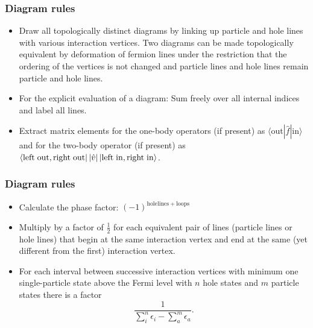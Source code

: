 \frame
{
\frametitle{Diagram rules}
\begin{small}
{\scriptsize
    \begin{itemize}
        \item Draw all topologically distinct diagrams by linking up particle and hole lines with various interaction vertices. Two diagrams can be made topologically equivalent by deformation of fermion lines under the restriction that the ordering of the vertices is not changed and particle lines and hole lines remain particle and hole lines.
        \item For the explicit evaluation of a diagram: Sum freely over all internal indices and label all lines. 
        \item Extract matrix elements for the one-body operators (if present) as $\langle \mathrm{out} |\hat{f}| \mathrm{in}\rangle$ and for the two-body operator (if present) as  
            $\bra{\mathrm{left\hspace{0.1cm}out, right\hspace{0.1cm}out}}|\hat{v}|\,|{\mathrm{left\hspace{0.1cm}in, right\hspace{0.1cm}in}}\rangle$. 
    \end{itemize}

}
\end{small}
}

\frame
{
\frametitle{Diagram rules}
\begin{small}
{\scriptsize
    \begin{itemize}
        \item Calculate the phase factor: $(-1)^{\mathrm{holelines} + \mathrm{loops}}$ 
        \item Multiply by a factor of $\frac{1}{2}$ for each equivalent pair of lines (particle lines or hole lines) that begin at the same interaction vertex and end at the same (yet different from the first) interaction vertex. 
\item For each interval between successive interaction vertices with minimum one single-particle state above the Fermi level with $n$ hole states and $m$ particle states there is a factor
\[
\frac{1}{\sum_i^n\epsilon_i-\sum_a^m\epsilon_a}.
\]
\end{itemize}

}
\end{small}
}


